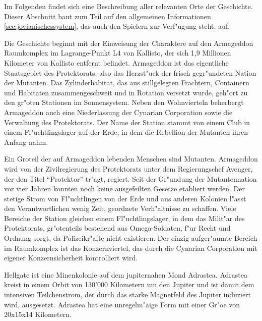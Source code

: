 

Im Folgenden findet sich eine Beschreibung aller relevanten Orte der Geschichte. Dieser Abschnitt baut zum Teil auf den allgemeinen Informationen \cref{sec:jovianischessystem}, das auch den Spielern zur Verf"ugung steht, auf.


Die Geschichte beginnt mit der Einweisung der Charaktere auf den Armageddon Raumkomplex im Lagrange-Punkt L4 von Kallisto, der sich 1,9 Millionen Kilometer von Kallisto entfernt befindet. Armageddon ist das eigentliche Staatsgebiet des Protektorats, also das Herzst"uck der frisch gegr"undeten Nation der Mutanten. Das Zylinderhabitat, das aus stillgelegten Frachtern, Containern und Habitaten zusammengeschwei\3t und in Rotation versetzt wurde, geh"ort zu den gr"o\3ten Stationen im Sonnensystem. Neben den Wohnvierteln beherbergt Armageddon auch eine Niederlassung der Cynarian Corporation sowie die Verwaltung des Protektorats. Der Name der Station stammt von einem Club in einem Fl"uchtlingslager auf der Erde, in dem die Rebellion der Mutanten ihren Anfang nahm.

Ein Gro\3teil der auf Armageddon lebenden Menschen sind Mutanten. Armageddon wird von der Zivilregierung des Protektorats unter dem Regierungschef Avenger, der den Titel ``Protektor'' tr"agt, regiert. Seit der Gr"undung der Mutantennation vor vier Jahren konnten noch keine ausgefeilten Gesetze etabliert werden. Der stetige Strom von Fl"uchtlingen von der Erde und aus anderen Kolonien l"asst den Verantwortlichen wenig Zeit, geordnete Verh"altnisse zu schaffen. Viele Bereiche der Station gleichen einem Fl"uchtlingslager, in dem das Milit"ar des Protektorats, gr"o\3tenteils bestehend aus Omega-Soldaten, f"ur Recht und Ordnung sorgt, da Polizeikr"afte nicht existieren. Der einzig aufger"aumte Bereich im Raumkomplex ist das Konzernviertel, das durch die Cynarian Corporation mit eigener Konzernsicherheit kontrolliert wird.


Hellgate ist eine Minenkolonie auf dem jupiternahen Mond Adrastea. Adrastea kreist in einem Orbit von 130'000 Kilometern um den Jupiter und
ist damit dem intensiven Teilchenstrom, der durch das starke Magnetfeld des Jupiter induziert wird, ausgesetzt. Adrastea hat eine unregelm"a\3ige Form mit einer Gr"o\3e von 20x15x14 Kilometern.

